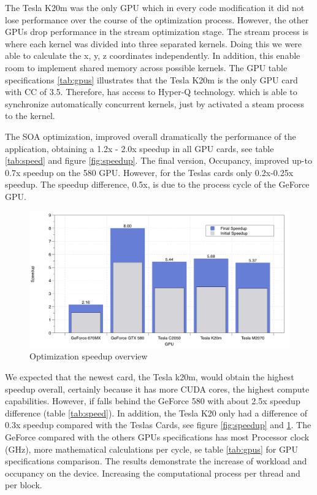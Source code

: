 The Tesla K20m was the only GPU which in every code modification it did not lose performance over the course of the optimization process. However, the other GPUs drop performance in the stream optimization stage. The stream process is where each kernel was divided into three separated kernels. Doing this we were able to calculate the x, y, z coordinates independently. In addition, this enable room to implement shared memory across possible kernels. The GPU table specifications \ref{tab:gpus} illustrates that the Tesla K20m is the only GPU card with CC of 3.5. Therefore, has access to Hyper-Q technology. which is able to synchronize automatically concurrent kernels, just by activated a steam process to the kernel.

The SOA optimization, improved overall dramatically the performance of the application, obtaining a 1.2x - 2.0x speedup in all GPU cards, see table \ref{tab:speed} and figure \ref{fig:speedup}. The final version, Occupancy, improved up-to 0.7x speedup on the 580 GPU. However, for the Teslas cards only 0.2x-0.25x speedup. The speedup difference, 0.5x,  is due to the process cycle of the GeForce GPU. 

\begin{figure}[htbp]
	\centering
		\includegraphics[width=1.0\textwidth]{Figures/speed.png}
		\smallskip
	\caption[Optimization speedup overview]{Optimization speedup overview}
	\label{fig:speeduplast}
\end{figure}


We expected that the newest card, the Tesla k20m, would obtain the highest speedup overall, certainly because it has more CUDA cores, the highest compute capabilities. However, if falls behind the GeForce 580 with about 2.5x speedup difference (table \ref{tab:speed}). In addition, the Tesla K20 only had a difference of 0.3x speedup compared with the Teslas Cards, see figure \ref{fig:speedup} and \ref{fig:speeduplast}. The GeForce compared with the others GPUs specifications has most Processor clock (GHz), more mathematical calculations per cycle, se table \ref{tab:gpus} for GPU specifications comparison. The results demonstrate the increase of workload and occupancy on the device. Increasing the computational process per thread and per block.


